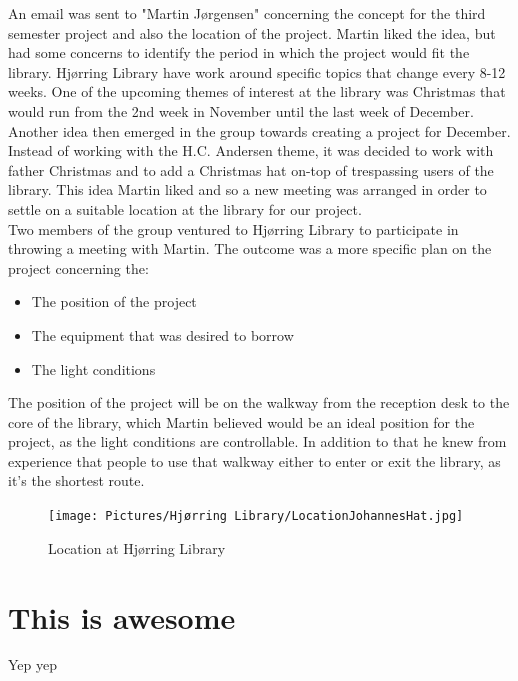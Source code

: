 An email was sent to "Martin Jørgensen" concerning the concept for the third semester project and also the location of the project. Martin liked the idea, but had some concerns to identify the period in which the project would fit the library. Hjørring Library have work around specific topics that change every 8-12 weeks. One of the upcoming themes of interest at the library was Christmas that would run from the 2nd week in November until the last week of December. Another idea then emerged in the group towards creating a project for December. Instead of working with the H.C. Andersen theme, it was decided to work with father Christmas and to add a Christmas hat on-top of trespassing users of the library. This idea Martin liked and so a new meeting was arranged in order to settle on a suitable location at the library for our project.\\
Two members of the group ventured to Hjørring Library to participate in throwing a meeting with Martin. The outcome was a more specific plan on the project concerning the:
\begin{itemize}
\item The position of the project
\item The equipment that was desired to borrow
\item The light conditions
\end{itemize}
The position of the project will be on the walkway from the reception desk to the core of the library, which Martin believed would be an ideal position for the project, as the light conditions are controllable. In addition to that he knew from experience that people to use that walkway either to enter or exit the library, as it's the shortest route.
\begin{figure}[htbp]
\centering
\texttt{[image: Pictures/Hjørring Library/LocationJohannesHat.jpg]}
\caption{Location at Hjørring Library}
\label{fig:Location at Hjørring Library}
\end{figure}



     


\section{This is awesome}
Yep yep

